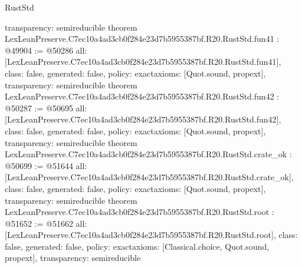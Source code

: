 \begin{lexlean}{RustStd}
\begin{coremodule}
{  transparency: semireducible
}
theorem LexLeanPreserve.C7ec10a4ad3cb0f284e23d7b5955387bf.R20.RustStd.fun41 : @49904 := @50286 {
  all: [LexLeanPreserve.C7ec10a4ad3cb0f284e23d7b5955387bf.R20.RustStd.fun41],
  class: false,
  generated: false,
  policy: exact{axioms: [Quot.sound, propext]},
  transparency: semireducible
}
theorem LexLeanPreserve.C7ec10a4ad3cb0f284e23d7b5955387bf.R20.RustStd.fun42 : @50287 := @50695 {
  all: [LexLeanPreserve.C7ec10a4ad3cb0f284e23d7b5955387bf.R20.RustStd.fun42],
  class: false,
  generated: false,
  policy: exact{axioms: [Quot.sound, propext]},
  transparency: semireducible
}
theorem LexLeanPreserve.C7ec10a4ad3cb0f284e23d7b5955387bf.R20.RustStd.crate_ok : @50699 := @51644 {
  all: [LexLeanPreserve.C7ec10a4ad3cb0f284e23d7b5955387bf.R20.RustStd.crate_ok],
  class: false,
  generated: false,
  policy: exact{axioms: [Quot.sound, propext]},
  transparency: semireducible
}
theorem LexLeanPreserve.C7ec10a4ad3cb0f284e23d7b5955387bf.R20.RustStd.root : @51652 := @51662 {
  all: [LexLeanPreserve.C7ec10a4ad3cb0f284e23d7b5955387bf.R20.RustStd.root],
  class: false,
  generated: false,
  policy: exact{axioms: [Classical.choice, Quot.sound, propext]},
  transparency: semireducible
}


\end{coremodule}
\end{lexlean}
